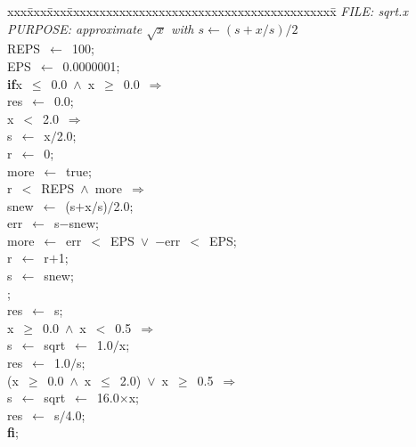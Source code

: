 \documentclass{report}
\begin{document}
\pagestyle{empty}
\begin{tabbing}
xxx\=xxx\=xxx\=xxxxxxxxxxxxxxxxxxxxxxxxxxxxxxxxxxxxxxxxx\=\kill
{\tt{}}{\em{} FILE:    sqrt.x}\\
{\tt{}}{\em{} PURPOSE: approximate $\sqrt{x}$ with $s \leftarrow (s+x/s)/2$}\\
REPS\ $\leftarrow$\ 100;\\
EPS\ $\leftarrow$\ 0.0000001;\\
{\bf if}\>x\ $\leq$\ 0.0\ $\wedge$\ x\ $\geq$\ 0.0\ $\Rightarrow$
\\
\>res\ $\leftarrow$\ 0.0;\\
\raisebox{2pt}{\ \ \framebox[2pt]{\rule{0pt}{1pt}}}
\>x\ $<$\ 2.0\ $\Rightarrow$
\>\>\\
\>s\ $\leftarrow$\ x$/$2.0;\\
\>r\ $\leftarrow$\ 0;\\
\>more\ $\leftarrow$\ true;\>\>\\
\>r\ $<$\ REPS\ $\wedge$\ more\ $\Rightarrow$
\>\\
\>\>snew\ $\leftarrow$\ (s$+$x$/$s)$/$2.0;\\
\>\>err\ $\leftarrow$\ s$-$snew;\\
\>\>more\ $\leftarrow$\ err\ $<$\ EPS\ $\vee$\ $-$err\ $<$\ EPS;\\
\>\>r\ $\leftarrow$\ r$+$1;\\
\>\>s\ $\leftarrow$\ snew;\\
;
\\
\>res\ $\leftarrow$\ s;\\
\raisebox{2pt}{\ \ \framebox[2pt]{\rule{0pt}{1pt}}}
\>x\ $\geq$\ 0.0\ $\wedge$\ x\ $<$\ 0.5\ $\Rightarrow$
\>\>\\
\>s\ $\leftarrow$\ sqrt\ $\leftarrow$\ 1.0$/$x;\\
\>res\ $\leftarrow$\ 1.0$/$s;\\
\raisebox{2pt}{\ \ \framebox[2pt]{\rule{0pt}{1pt}}}
\>(x\ $\geq$\ 0.0\ $\wedge$\ x\ $\leq$\ 2.0)\ $\vee$\ x\ $\geq$\ 0.5\ $\Rightarrow$
\>\>\\
\>s\ $\leftarrow$\ sqrt\ $\leftarrow$\ 16.0$\times$x;\\
\>res\ $\leftarrow$\ s$/$4.0;\\
{\bf {f}{i}};
\\
\end{tabbing}
\end{document}
